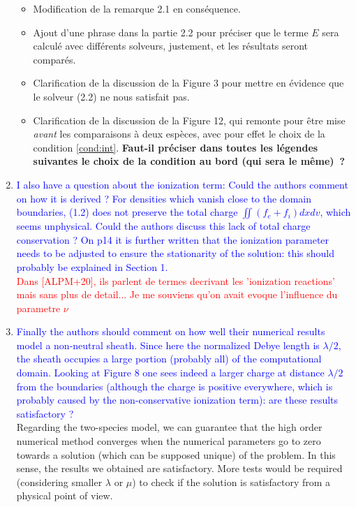 \documentclass{article}
\begin{document}
\begin{enumerate}
{\begin{itemize}
\item Modification de la remarque 2.1 en conséquence. 
\item Ajout d'une phrase dans la partie 2.2 pour préciser que le terme $E$ sera calculé avec différents solveurs, justement, et les résultats seront comparés.
\item Clarification de la discussion de la Figure 3 pour mettre en évidence que le solveur (2.2) ne nous satisfait pas. 
\item Clarification de la discussion de la Figure 12, qui remonte pour être mise \emph{avant} les comparaisons à deux espèces, avec pour effet le choix de la condition \ref{cond:int}. \textbf{Faut-il préciser dans toutes les légendes suivantes le choix de la condition au bord (qui sera le même)~?}
\end{itemize}}
\item \textcolor{blue}{I also have a question about the ionization term: Could the authors comment on how
it is derived ? For densities which vanish close to the domain boundaries,
(1.2) does not preserve the total charge $\iint (f_e + f_i) dx dv$, which seems unphysical.
Could the authors discuss this lack of total charge conservation ?
On p14 it is further written that the ionization parameter needs to be adjusted to ensure the
stationarity of the solution: this should probably be explained in Section 1. }\\ 
\textcolor{red}{Dans [ALPM+20], ils parlent de termes decrivant les 'ionization reactions' mais sans plus de detail... Je me souviens qu'on avait evoque l'influence du parametre $\nu$ }
\item \textcolor{blue}{Finally the authors should comment on how well their numerical results model a non-neutral sheath. Since here the normalized Debye length is $\lambda/2$, the sheath
occupies a large portion (probably all) of the computational domain.
Looking at Figure 8 one sees indeed a larger charge at distance $\lambda/2$ from the boundaries (although the charge is positive everywhere, which is probably
caused by the non-conservative ionization term): are these results satisfactory ?}\\ 
Regarding the two-species model, we can guarantee that the high order numerical method converges when the numerical parameters 
go to zero towards a solution (which can be supposed unique) of the problem. In this sense, the results we obtained are satisfactory. 
More tests would be required (considering smaller $\lambda$ or $\mu$) to check if the solution is satisfactory from a physical point of view. 
\end{enumerate}
\end{document}
